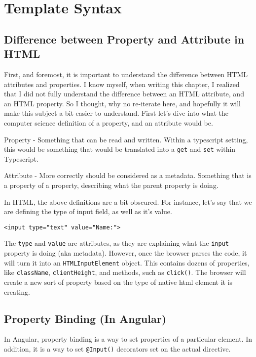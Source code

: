 
\chapter{ Template Syntax }

\section{ Difference between Property and Attribute in HTML }

First, and foremost, it is important to understand the difference between HTML 
attributes and properties. I know myself, when writing this chapter, I realized
that I did not fully understand the difference between an HTML attribute, and
an HTML property. So I thought, why no re-iterate here, and hopefully it will
make this subject a bit easier to understand. First let's dive into what the 
computer science definition of a property, and an attribute would be. 

Property - Something that can be read and written. Within a typescript setting, 
this would be something that would be translated into a \lstinline{get} and  
\lstinline{set} within Typescript. 

Attribute - More correctly should be considered as a metadata. Something that
is a property of a property, describing what the parent property is doing. 

In HTML, the above definitions are a bit obscured. For instance, let's say
that we are defining the type of input field, as well as it's value. 
\begin{lstlisting}
<input type="text" value="Name:">  
\end{lstlisting}

The \lstinline{type} and \lstinline{value} are attributes, as they are 
explaining what the \lstinline{input} property is doing (aka metadata).
However, once the browser parses the code, it will turn it into an 
\lstinline{HTMLInputElement} object. This contains dozens of properties, like 
\lstinline{className}, \lstinline{clientHeight}, and methods, such as 
\lstinline{click()}. The browser will create a new sort of property based on 
the type of native html element it is creating. 


\section{ Property Binding (In Angular) }
In Angular, property binding is a way to set properties of a particular 
element. In addition, it is a way to set \lstinline{@Input()} decorators set 
on the actual directive. 

